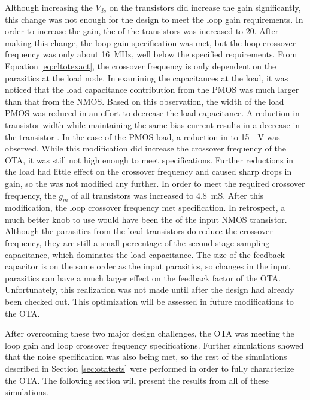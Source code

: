 Although increasing the $V_{ds}$ on the transistors did increase the gain significantly, this change was not enough for the design to meet the loop gain requirements. In order to increase the gain, the \gmid\spc of the transistors was increased to 20. After making this change, the loop gain specification was met, but the loop crossover frequency was only about \SI{16}{\mega\hertz}, well below the specified requirements. From Equation \ref{eq:cltotexact}, the crossover frequency is only dependent on the parasitics at the load node. In examining the capacitances at the load, it was noticed that the load capacitance contribution from the PMOS was much larger than that from the NMOS. Based on this observation, the width of the load PMOS was reduced in an effort to decrease the load capacitance. A reduction in transistor width while maintaining the same bias current results in a decrease in the transistor \gmid\spc. In the case of the PMOS load, a reduction in \gmid\spc to \SI{15}{\per\volt} was observed. While this modification did increase the crossover frequency of the OTA, it was still not high enough to meet specifications. Further reductions in the load \gmid\spc had little effect on the crossover frequency and caused sharp drops in gain, so the \gmid\spc was not modified any further. In order to meet the required crossover frequency, the $g_{m}$ of all transistors was increased to \SI{4.8}{\milli\siemens}. After this modification, the loop crossover frequency met specification. In retrospect, a much better knob to use would have been the \gmid\spc of the input NMOS transistor. Although the parasitics from the load transistors do reduce the crossover frequency, they are still a small percentage of the second stage sampling capacitance, which dominates the load capacitance. The size of the feedback capacitor is on the same order as the input parasitics, so changes in the input parasitics can have a much larger effect on the feedback factor of the OTA. Unfortunately, this realization was not made until after the design had already been checked out. This optimization will be assessed in future modifications to the OTA.

After overcoming these two major design challenges, the OTA was meeting the loop gain and loop crossover frequency specifications. Further simulations showed that the noise specification was also being met, so the rest of the simulations described in Section \ref{sec:otatests} were performed in order to fully characterize the OTA. The following section will present the results from all of these simulations.
